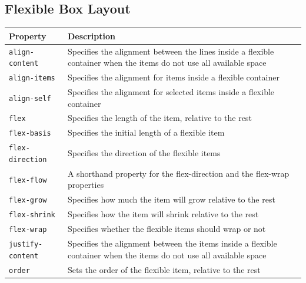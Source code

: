 \documentclass[11pt, letterpaper]{article}
\begin{document}
		\subsection{Flexible Box Layout}
			\begin{longtable}{p{5cm} p{10cm}}
				\toprule
				Property & Description \\\midrule 
				\texttt{align-content} & Specifies the alignment between the lines inside a flexible container when the items do not use all available space \\\midrule
				\texttt{align-items} & Specifies the alignment for items inside a flexible container \\\midrule
				\texttt{align-self} & Specifies the alignment for selected items inside a flexible container \\\midrule
				\texttt{flex} & Specifies the length of the item, relative to the rest \\\midrule
				\texttt{flex-basis} & Specifies the initial length of a flexible item \\\midrule
				\texttt{flex-direction} & Specifies the direction of the flexible items \\\midrule
				\texttt{flex-flow} & A shorthand property for the flex-direction and the flex-wrap properties \\\midrule
				\texttt{flex-grow} & Specifies how much the item will grow relative to the rest \\\midrule
				\texttt{flex-shrink} & Specifies how the item will shrink relative to the rest \\\midrule
				\texttt{flex-wrap} & Specifies whether the flexible items should wrap or not \\\midrule
				\texttt{justify-content} & Specifies the alignment between the items inside a flexible container when the items do not use all available space \\\midrule
				\texttt{order} & Sets the order of the flexible item, relative to the rest \\\midrule
			\end{longtable}
\end{document}
